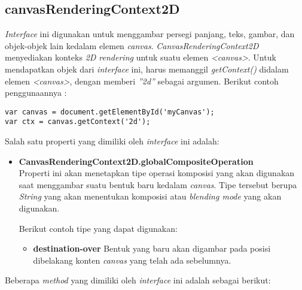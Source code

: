 \subsection{canvasRenderingContext2D} 

\textit{Interface} ini digunakan untuk menggambar persegi panjang, teks, gambar, dan objek-objek lain kedalam elemen \textit{canvas}. \textit{CanvasRenderingContext2D} menyediakan konteks \textit{2D rendering} untuk suatu elemen \textit{<canvas>}.
Untuk mendapatkan objek dari \textit{interface} ini, harus memanggil \textit{getContext()} didalam elemen \textit{<canvas>}, dengan memberi \textit{''2d''} sebagai argumen. Berikut contoh penggunaannya :

\begin{lstlisting}
var canvas = document.getElementById('myCanvas');
var ctx = canvas.getContext('2d');
\end{lstlisting}

Salah satu properti yang dimiliki oleh \textit{interface} ini adalah:
\begin{itemize}
	\item \textbf{CanvasRenderingContext2D.globalCompositeOperation} \\
	Properti ini akan menetapkan tipe operasi komposisi yang akan digunakan saat menggambar suatu bentuk baru kedalam \textit{canvas}. Tipe tersebut berupa \textit{String} yang akan menentukan komposisi atau \textit{blending mode} yang akan digunakan. 
	
	Berikut contoh tipe yang dapat digunakan:
	\begin{itemize}
		\item \textbf{destination-over} Bentuk yang baru akan digambar pada posisi dibelakang konten \textit{canvas} yang telah ada sebelumnya.
	\end{itemize}
\end{itemize}

Beberapa \textit{method} yang dimiliki oleh \textit{interface} ini adalah sebagai berikut:

